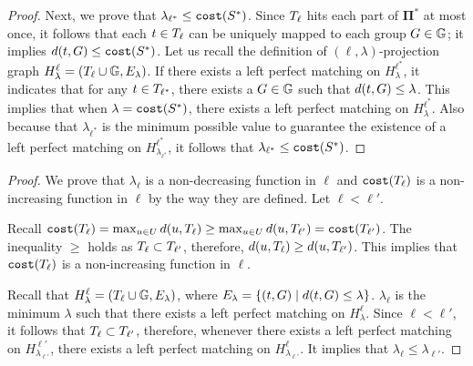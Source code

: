 \begin{proof}
Next, we prove that $\lambda_{\ell^*} \leq \texttt{cost}(S^*)$. 
Since $T_{\ell}$ hits each part of $\mathbf{\Pi}^*$ at most once, it follows that each $t \in T_{\ell}$ can be uniquely mapped to each group $G \in \mathbb{G}$; it implies $d(t, G) \leq \texttt{cost}(S^*)$.
Let us recall the definition of $(\ell,\lambda)$-projection graph $H^{\ell}_{\lambda} = (T_{\ell} \cup \mathbb{G}, E_{\lambda})$.
If there exists a left perfect matching on $H^{\ell^*}_{\lambda}$, it indicates that for any $t \in T_{\ell^*}$, there exists a $G \in \mathbb{G}$ such that $d(t, G) \leq \lambda$.
This implies that when $\lambda = \texttt{cost}(S^*)$, there exists a left perfect matching on $H^{\ell^*}_{\lambda}$.
Also because that $\lambda_{\ell^*}$ is the minimum possible value to guarantee the existence of a left perfect matching on $H^{\ell^*}_{\lambda_{\ell^*}}$, it follows that $\lambda_{\ell^*} \leq \texttt{cost}(S^*)$.
\end{proof}

\monotonicitypropertiesoflambdaell* 
\begin{proof}
    We prove that $\lambda_{\ell}$ is a non-decreasing function in $\ell$ and $\texttt{cost}(T_{\ell})$ is a non-increasing function in $\ell$ by the way they are defined. 
    Let $\ell < \ell'$.

    Recall $\texttt{cost}(T_{\ell}) = \max_{u \in U} d(u, T_{\ell}) \geq \max_{u \in U} d(u, T_{\ell'}) = \texttt{cost}(T_{\ell'})$. 
    The inequality $\geq$ holds as $T_{\ell} \subset T_{\ell'}$, therefore, $d(u, T_{\ell}) \geq d(u, T_{\ell'})$. 
    This implies that $\texttt{cost}(T_{\ell})$ is a non-increasing function in $\ell$.

    Recall that $H^{\ell}_{\lambda} = (T_{\ell} \cup \mathbb{G}, E_{\lambda})$, where $E_{\lambda} = \{(t, G) \mid d(t, G) \leq \lambda\}$. 
    $\lambda_{\ell}$ is the minimum $\lambda$ such that there exists a left perfect matching on $H^{\ell}_{\lambda}$.
    Since $\ell < \ell'$, it follows that $T_{\ell} \subset T_{\ell'}$, therefore, whenever there exists a left perfect matching on $H^{\ell'}_{\lambda_{\ell'}}$, there exists a left perfect matching on $H^{\ell}_{\lambda_{\ell'}}$.
    It implies that $\lambda_{\ell} \leq \lambda_{\ell'}$.
\end{proof}

